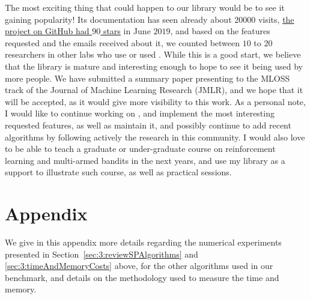 The most exciting thing that could happen to our \SMPyBandits{} library would be to see it gaining popularity!
Its documentation has seen already about $20000$ visits, \href{https://github.com/SMPyBandits/SMPyBandits/stargazers}{the project on GitHub had $90$ stars} in June $2019$, and based on the features requested and the emails received about it, we counted between $10$ to $20$ researchers in other labs who use or used \SMPyBandits.
While this is a good start, we believe that the library is mature and interesting enough to hope to see it being used by more people.
%
We have submitted a summary paper presenting \SMPyBandits{} \cite{SMPyBanditsJMLR} to the MLOSS track of the Journal of Machine Learning Research (JMLR), and we hope that it will be accepted, as it would give more visibility to this work.
%
As a personal note, I would like to continue working on \SMPyBandits, and implement the most interesting requested features, as well as maintain it, and possibly continue to add recent algorithms by following actively the research in this community.
I would also love to be able to teach a graduate or under-graduate course on reinforcement learning and multi-armed bandits in the next years, and use my library as a support to illustrate such course, as well as practical sessions.


\newpage  %
\section{Appendix}
\label{sec:3:appendix}

We give in this appendix more details regarding the numerical experiments presented in Section~\ref{sec:3:reviewSPAlgorithms} and \ref{sec:3:timeAndMemoryCosts} above,
for the other algorithms used in our benchmark,
and details on the methodology used to measure the time and memory.



